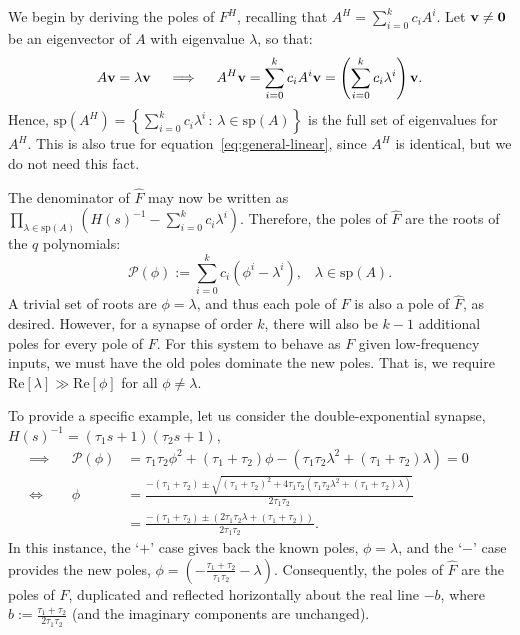 We begin by deriving the poles of $F^H$, recalling that $A^H = \sum_{i=0}^k c_i A^i$.
Let $\mathbf{v} \ne \mathbf{0}$ be an eigenvector of $A$ with eigenvalue $\lambda$, %
so that:
\begin{align*}
A\mathbf{v} = \lambda \mathbf{v} \quad \implies \quad A^H \mathbf{v} = \sum_{i=0}^k c_i A^i \mathbf{v} = \left( \sum_{i=0}^k c_i \lambda^i \right) \mathbf{v} \text{.}
\end{align*}
Hence, $\text{sp}\left(A^H \right) = \left\{  \sum_{i=0}^k c_i \lambda^i \,:\, \lambda \in \text{sp}(A) \right\}$ is the full set of eigenvalues for $A^H$.
This is also true for equation~\ref{eq:general-linear}, since $A^H$ is identical, but we do not need this fact.

The denominator of $\hat{F}$ may now be written as $\prod_{\lambda \in \text{sp}(A)} \left( H(s)^{-1} - \sum_{i=0}^k c_i \lambda^i \right)$.
Therefore, the poles of $\hat{F}$ are the roots of the $q$ polynomials:
\begin{equation*}
\mathcal{P}(\phi) := \sum_{i=0}^k c_i \left( \phi^i - \lambda^i \right) \text{,} \quad \lambda \in \text{sp}(A) \text{.}
\end{equation*}
A trivial set of roots are $\phi = \lambda$, and thus each pole of $F$ is also a pole of $\hat{F}$, as desired.
However, for a synapse of order $k$, there will also be $k - 1$ additional poles for every pole of $F$.
For this system to behave as $F$ given low-frequency inputs, we must have the old poles dominate the new poles.
That is, we require $\text{Re} \left[ \lambda \right] \gg \text{Re} \left[ \phi \right]$ for all $\phi \ne \lambda$.

To provide a specific example, let us consider the double-exponential synapse, $H(s)^{-1} = (\tau_1 s + 1)(\tau_2 s + 1)$,
\begin{align*}
\implies && \mathcal{P}(\phi) &= \tau_1 \tau_2 \phi^2 + (\tau_1 + \tau_2) \phi - (\tau_1 \tau_2 \lambda^2 + (\tau_1 + \tau_2) \lambda) = 0 && \\
\iff && \phi &= \frac{-(\tau_1 + \tau_2) \pm \sqrt{(\tau_1 + \tau_2)^2 + 4\tau_1 \tau_2 \left(\tau_1 \tau_2 \lambda^2 + (\tau_1 + \tau_2) \lambda \right)}}{2 \tau_1 \tau_2} && \\
&& &= \frac{-(\tau_1 + \tau_2) \pm \left(2 \tau_1 \tau_2 \lambda + (\tau_1 + \tau_2) \right)}{2 \tau_1 \tau_2} \text{.} &&
\end{align*}
In this instance, the `$+$' case gives back the known poles, $\phi = \lambda$, and the `$-$' case provides the new poles, $\phi = \left(- \frac{\tau_1 + \tau_2}{\tau_1 \tau_2} - \lambda \right)$.
Consequently, the poles of $\hat{F}$ are the poles of $F$, duplicated and reflected horizontally about the real line $- b$, where $b := \frac{\tau_1 + \tau_2}{2 \tau_1 \tau_2}$ (and the imaginary components are unchanged).

